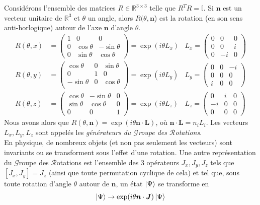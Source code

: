 \documentclass[../notesdecours.tex]{subfiles}
\begin{document}
Considérons l'ensemble des matrices $R \in \mathbb{R}^{3\times 3}$ telle que $R^TR = \mathbb{I}$. Si $\bm{n}$ est un vecteur unitaire de $\mathbb{R}^3$ et $\theta$ un angle, alors $R(\theta,\bm{n}$) est la rotation (en son sens anti-horlogique) autour de l'axe $\bm{n}$ d'angle $\theta$.
\begin{align*}
R(\theta,x) &= \begin{pmatrix}
1 & 0 & 0\\
0 & \cos\theta & -\sin\theta\\
0 & \sin\theta & \cos\theta
\end{pmatrix} = \exp (i\theta L_x)			&L_x = \begin{pmatrix}
0 & 0 & 0\\
0 & 0 & i\\
0 & -i & 0
\end{pmatrix}\\
R(\theta,y) &= \begin{pmatrix}
\cos\theta & 0 & \sin\theta\\
0 & 1 & 0\\
-\sin\theta & 0 & \cos\theta\\
\end{pmatrix} = \exp(i\theta L_y)		&L_y = \begin{pmatrix}
0 & 0 & -i\\
0 & 0 & 0\\
i & 0 & 0
\end{pmatrix}\\
R(\theta,z) &= \begin{pmatrix}
\cos\theta & -\sin\theta & 0\\
\sin\theta & \cos\theta & 0\\
0 & 0 & 1
\end{pmatrix} = \exp(i\theta L_z)		&L_z = \begin{pmatrix}
0 & i & 0\\
-i & 0 & 0\\
0 & 0 & 0
\end{pmatrix}
\end{align*}
Nous avons alors que $R(\theta,\bm{n}) = \exp (i\theta\bm{n}\cdot\bm{L})$, où $\bm{n}\cdot\bm{L} = n_iL_i$. Les vecteurs $L_x,L_y,L_z$ sont appelés les \emph{générateurs du $\mathcal{G}$roupe des $\mathcal{R}$otations}.\\

En physique, de nombreux objets (et non pas seulement les vecteurs) sont invariants ou se transforment sous l'effet d'une rotation. Une autre représentation du $\mathcal{G}$roupe des $\mathcal{R}$otations est l'ensemble des 3 opérateurs $J_x,J_y,J_z$ tels que $[J_x,J_y] = J_z$ (ainsi que toute permutation cyclique de cela) et tel que, sous toute rotation d'angle $\theta$ autour de $\bm{n}$, un état $\ket{\Psi}$ se transforme en
\begin{equation}
\ket{\Psi} \rightarrow \exp(i\theta\bm{n}\cdot\bm{J})\ket{\Psi}
\end{equation}
\end{document}
